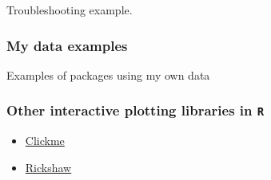 \documentclass[10,portrait]{article}
\providecommand{\tightlist}{%
  \setlength{\itemsep}{0pt}\setlength{\parskip}{0pt}}
\begin{document}
Troubleshooting example.

\subsubsection{My data examples}\label{my-data-examples}

Examples of packages using my own data

\subsubsection{\texorpdfstring{Other interactive plotting libraries in
\texttt{R}}{Other interactive plotting libraries in R}}\label{other-interactive-plotting-libraries-in-r}

\begin{itemize}
\tightlist
\item
  \href{https://github.com/nachocab/clickme}{Clickme}\\
\item
  \href{http://rpubs.com/Koba/80208}{Rickshaw}
\end{itemize}

\printbibliography
\end{document}
